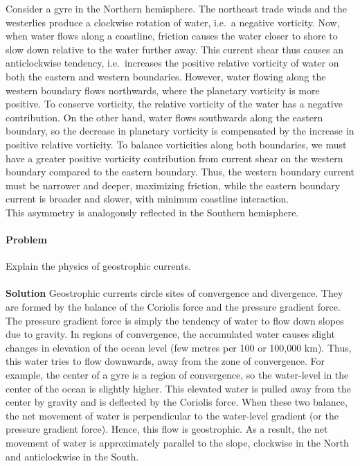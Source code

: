 \documentclass[10pt]{article}
\newcounter{prob}
\def\problem{\stepcounter{prob}\paragraph{Problem \arabic{prob}}}
\def\solution{\\\\\textbf{Solution }}
\begin{document}
        Consider a gyre in the Northern hemisphere.
        The northeast trade winds and the westerlies produce a clockwise rotation of water, i.e.\ a negative vorticity.
        Now, when water flows along a coastline, friction causes the water closer to shore to slow down relative to the water further away.
        This current shear thus causes an anticlockwise tendency, i.e.\ increases the positive relative vorticity of water on both the 
        eastern and western boundaries. However, water flowing along the western boundary flows northwards, where the planetary vorticity is
        more positive. To conserve vorticity, the relative vorticity of the water has a negative contribution. On the other hand,
        water flows southwards along the eastern boundary, so the decrease in planetary vorticity is compensated by the increase in positive
        relative vorticity. To balance vorticities along both boundaries, we must have a greater positive vorticity contribution from current 
        shear on the western boundary compared to the eastern boundary. Thus, the western boundary current must be narrower and deeper,
        maximizing friction, while the eastern boundary current is broader and slower, with minimum coastline interaction. \\

        This asymmetry is analogously reflected in the Southern hemisphere.

        \problem Explain the physics of geostrophic currents.
        \solution Geostrophic currents circle sites of convergence and divergence. They are formed by the balance of the Coriolis force
        and the pressure gradient force. The pressure gradient force is simply the tendency of water to flow down slopes due to gravity. In regions of
        convergence, the accumulated water causes slight changes in elevation of the ocean level (few metres per 100 or 100,000 km).
        Thus, this water tries to flow downwards, away from the zone of convergence. For example, the center of a gyre is a region of convergence,
        so the water-level in the center of the ocean is slightly higher. This elevated water is pulled away from the center by gravity and is deflected
        by the Coriolis force. When these two balance, the net movement of water is perpendicular to the water-level gradient (or the pressure
        gradient force). Hence, this flow is geostrophic. As a result, the net movement of water is approximately parallel to the slope,
        clockwise in the North and anticlockwise in the South.
\end{document}
